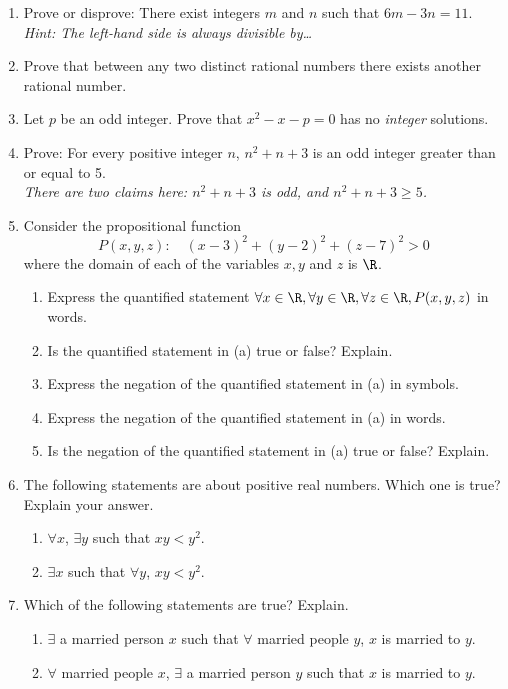 \begin{enumerate}
	\item Prove or disprove: There exist integers $m$ and $n$ such that $6m-3n=11$.\\
  \emph{Hint: The left-hand side is always  divisible by\ldots}
  
	\item Prove that between any two distinct rational numbers there exists another rational number.

	\item Let $p$ be an odd integer. Prove that $x^2-x-p=0$ has no \emph{integer} solutions.
   
	\item Prove: For every positive integer $n$, $n^2+n+3$ is an odd integer greater than or equal to 5.\\
	\emph{There are two claims here: $n^2+n+3$ is odd, and $n^2+n+3\ge 5$.}

  
	\item Consider the propositional function
  \[P(x,y,z):\quad (x-3)^2+(y-2)^2+(z-7)^2>0\]
  where the domain of each of the variables $x,y$ and $z$ is $\R$.\prelistskip
  \begin{enumerate}
    \item Express the quantified statement $\forall x\in\R,\forall y\in\R,\forall z\in\R, P(x,y,z)$ in words.
    \item Is the quantified statement in (a) true or false? Explain.
    \item Express the negation of the quantified statement in (a) in symbols.
    \item Express the negation of the quantified statement in (a) in words.
    \item Is the negation of the quantified statement in (a) true or false? Explain.
  \end{enumerate}
  
	\item The following statements are about positive real numbers. Which one is true? Explain your answer.\prelistskip
	\begin{enumerate}
	  \item $\forall x$, $\exists y$ such that $xy<y^2$.
	  \item $\exists x$ such that $\forall y$, $xy<y^2$.
	\end{enumerate}

	\item Which of the following statements are true? Explain.\prelistskip
	\begin{enumerate}
	  \item $\exists$ a married person $x$ such that $\forall$ married people $y$, $x$ is married to $y$.
	  \item $\forall$ married people $x$, $\exists$ a married person $y$ such that $x$ is married to $y$.
	\end{enumerate}
	

\end{enumerate}

